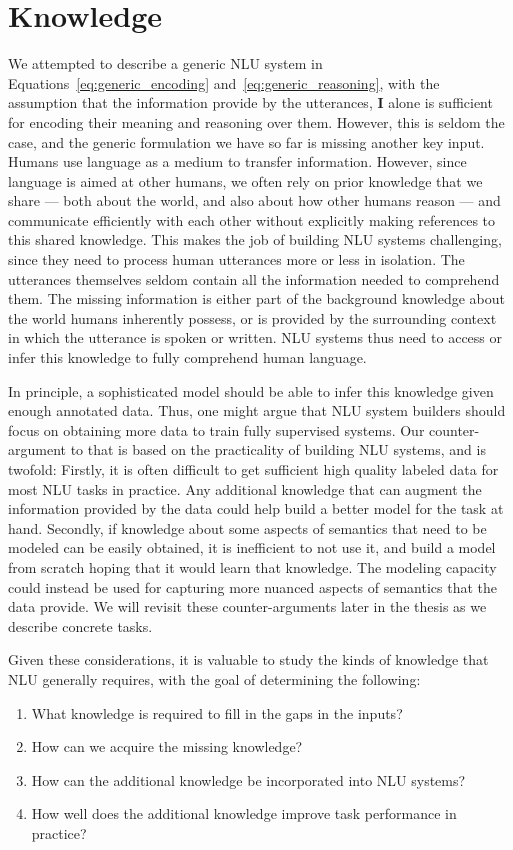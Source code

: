\section{Knowledge}\label{sec:intro_external_knowledge}
We attempted to describe a generic NLU system in Equations~\ref{eq:generic_encoding} and~\ref{eq:generic_reasoning}, with the assumption that the
information provide by the utterances, $\textbf{I}$ alone is sufficient for encoding their meaning and reasoning over them. However, this is seldom the case, and the generic formulation we have so far is missing another key input.
Humans use language as a medium to transfer information. However, since language is aimed at other humans, we often rely on prior 
knowledge that we share --- both about the world, and also about how other humans reason --- and communicate efficiently with each other without explicitly
making references to this shared knowledge. This makes the job of building NLU systems challenging, since they need to process human utterances more or less
in isolation. The utterances themselves seldom contain all the information needed to comprehend them. The missing information is either part of the background
knowledge about the world humans inherently possess, or is provided by the surrounding context in which the utterance is spoken or written. NLU systems thus
need to access or infer this knowledge to fully comprehend human language.

In principle, a sophisticated model should be able to infer this knowledge given enough annotated data. Thus, one might argue that NLU system builders should focus on
obtaining more data to train fully supervised systems. Our counter-argument to that is based on the practicality of building NLU systems, and is twofold: Firstly, it is
often difficult to get sufficient high quality labeled data for most NLU tasks in practice. Any additional knowledge that can augment the information provided by the data
could help build a better model for the task at hand. Secondly, if knowledge about some aspects of semantics that need to be modeled can be easily obtained, it is inefficient
to not use it, and build a model from scratch hoping that it would learn that knowledge. The modeling capacity could instead be used for capturing more nuanced aspects of semantics
that the data provide. We will revisit these counter-arguments later in the thesis as we describe concrete tasks.

Given these considerations, it is valuable to study the kinds of knowledge that NLU generally requires, with the goal of determining the following:
\begin{enumerate}
\item What knowledge is required to fill in the gaps in the inputs?
\item How can we acquire the missing knowledge?
\item How can the additional knowledge be incorporated into NLU systems?
\item How well does the additional knowledge improve task performance in practice?
\end{enumerate}

